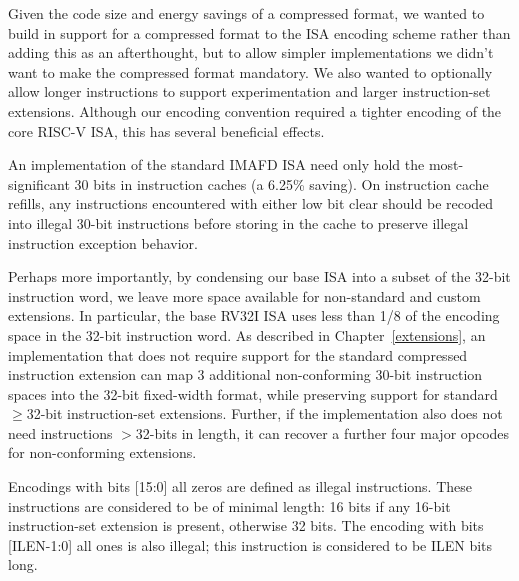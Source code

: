 \begin{commentary}
Given the code size and energy savings of a compressed format, we
wanted to build in support for a compressed format to the ISA encoding
scheme rather than adding this as an afterthought, but to allow
simpler implementations we didn't want to make the compressed format
mandatory. We also wanted to optionally allow longer instructions to
support experimentation and larger instruction-set extensions.
Although our encoding convention required a tighter encoding of the
core RISC-V ISA, this has several beneficial effects.

An implementation of the standard IMAFD ISA need only hold the
most-significant 30 bits in instruction caches (a 6.25\% saving).  On
instruction cache refills, any instructions encountered with either
low bit clear should be recoded into illegal 30-bit instructions
before storing in the cache to preserve illegal instruction exception
behavior.

Perhaps more importantly, by condensing our base ISA into a subset of
the 32-bit instruction word, we leave more space available for
non-standard and custom extensions.  In particular, the base RV32I ISA
uses less than 1/8 of the encoding space in the 32-bit instruction
word.  As described in Chapter~\ref{extensions}, an implementation
that does not require support for the standard compressed instruction
extension can map 3 additional non-conforming 30-bit instruction
spaces into the 32-bit fixed-width format, while preserving support
for standard $\geq$32-bit instruction-set extensions.  Further, if the
implementation also does not need instructions $>$32-bits in length,
it can recover a further four major opcodes for non-conforming extensions.
\end{commentary}

Encodings with bits [15:0] all zeros are defined as illegal
instructions.  These instructions are considered to be of minimal
length: 16 bits if any 16-bit instruction-set extension is present,
otherwise 32 bits.  The encoding with bits [ILEN-1:0] all ones is also
illegal; this instruction is considered to be ILEN bits long.

